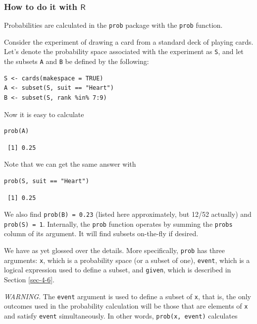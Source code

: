 \documentclass[captions=tableheading]{scrbook}
\begin{document}
\subsubsection{How to do it with \(\mathsf{R}\)}
\label{sec-4-4-3-1}


Probabilities are calculated in the \texttt{prob} package with the \texttt{prob} function.

Consider the experiment of drawing a card from a standard deck of playing cards. Let's denote the probability space associated with the experiment as \texttt{S}, and let the subsets \texttt{A} and \texttt{B} be defined by the following: 


\lstset{language=R}
\begin{lstlisting}
S <- cards(makespace = TRUE) 
A <- subset(S, suit == "Heart") 
B <- subset(S, rank %in% 7:9)
\end{lstlisting}

Now it is easy to calculate 


\lstset{language=R}
\begin{lstlisting}
prob(A)
\end{lstlisting}

\begin{verbatim}
 [1] 0.25
\end{verbatim}

Note that we can get the same answer with 


\lstset{language=R}
\begin{lstlisting}
prob(S, suit == "Heart")
\end{lstlisting}

\begin{verbatim}
 [1] 0.25
\end{verbatim}

We also find \texttt{prob(B) = 0.23} (listed here approximately, but 12/52 actually) and \texttt{prob(S) = 1}. Internally, the \texttt{prob} function operates by summing the \texttt{probs} column of its argument. It will find subsets on-the-fly if desired.

We have as yet glossed over the details. More specifically, \texttt{prob} has three arguments: \texttt{x}, which is a probability space (or a subset of one), \texttt{event}, which is a logical expression used to define a subset, and \texttt{given}, which is described in Section \ref{sec-4-6}.

\emph{WARNING}. The \texttt{event} argument is used to define a subset of \texttt{x}, that is, the only outcomes used in the probability calculation will be those that are elements of \texttt{x} and satisfy \texttt{event} simultaneously. In other words, \texttt{prob(x, event)} calculates 
\end{document}
